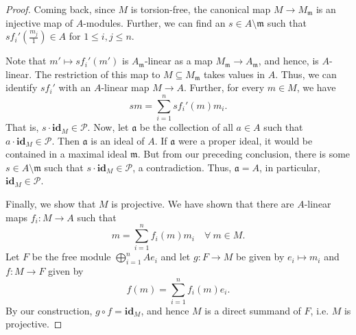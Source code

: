 \documentclass[12pt]{article}
\theoremstyle{thmstyle}
\theoremstyle{defstyle}
\newcommand{\id}{\mathbf{id}}
\newcommand{\fraka}{\mathfrak{a}} %
\newcommand{\frakm}{\mathfrak{m}} %
\newcommand{\scrP}{\mathscr P}
\renewcommand{\le}{\leqslant}
\begin{document}
\begin{proof}
    Coming back, since $M$ is torsion-free, the canonical map $M\to M_\frakm$ is an injective map of $A$-modules. Further, we can find an $s\in A\setminus\frakm$ such that $s f_i'\left(\frac{m_j}{1}\right)\in A$ for $1\le i,j\le n$. 

    Note that $m'\mapsto sf_i'(m')$ is $A_\frakm$-linear as a map $M_\frakm\to A_\frakm$, and hence, is $A$-linear. The restriction of this map to $M\subseteq M_\frakm$ takes values in $A$. Thus, we can identify $sf_i'$ with an $A$-linear map $M\to A$. Further, for every $m\in M$, we have 
    \begin{equation*}
        sm = \sum_{i = 1}^n sf_i'(m)m_i.
    \end{equation*}
    That is, $s\cdot\id_M\in\scrP$. Now, let $\fraka$ be the collection of all $a\in A$ such that $a\cdot\id_M\in\scrP$. Then $\fraka$ is an ideal of $A$. If $\fraka$ were a proper ideal, it would be contained in a maximal ideal $\frakm$. But from our preceding conclusion, there is some $s\in A\setminus\frakm$ such that $s\cdot\id_M\in\scrP$, a contradiction. Thus, $\fraka = A$, in particular, $\id_M\in\scrP$.

    Finally, we show that $M$ is projective. We have shown that there are $A$-linear maps $f_i: M\to A$ such that 
    \begin{equation*}
        m = \sum_{i = 1}^n f_i(m)m_i\quad\forall~m\in M.
    \end{equation*}
    Let $F$ be the free module $\bigoplus_{i = 1}^n Ae_i$ and let $g: F\to M$ be given by $e_i\mapsto m_i$ and $f: M\to F$ given by 
    \begin{equation*}
        f(m) = \sum_{i = 1}^n f_i(m)e_i.
    \end{equation*}
    By our construction, $g\circ f = \id_M$, and hence $M$ is a direct summand of $F$, i.e. $M$ is projective.
\end{proof}
\end{document}
